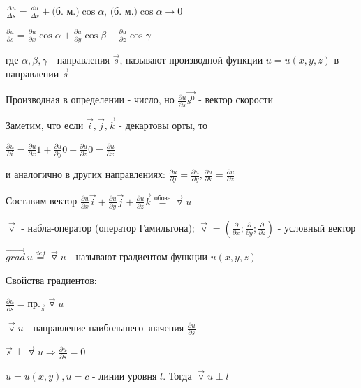 \documentclass[12pt]{article}
\begin{document}
    $\frac{\Delta u}{\Delta s} = \frac{du}{\Delta s} + \text{(б. м.)} \cos\alpha$, $\text{(б. м.)} \cos\alpha \rightarrow 0$

    \Def $\frac{\partial u}{\partial s} = \frac{\partial u}{\partial x} \cos\alpha + \frac{\partial u}{\partial y} \cos\beta + \frac{\partial u}{\partial z} \cos\gamma$

    где $\alpha, \beta, \gamma$ - направления $\overrightarrow{s}$, называют производной функции $u = u(x, y, z)$ в направлении $\overrightarrow{s}$

    \Nota Производная в определении - число, но $\frac{\partial u}{\partial s} \overrightarrow{s^0}$ - вектор скорости

    \Nota Заметим, что если $\overrightarrow{i}, \overrightarrow{j}, \overrightarrow{k}$ - декартовы орты, то

    $\frac{\partial u}{\partial i} = \frac{\partial u}{\partial x} 1 + \frac{\partial u}{\partial y} 0 + \frac{\partial u}{\partial z} 0 = \frac{\partial u}{\partial x}$

    и аналогично в других направлениях: $\frac{\partial u}{\partial j} = \frac{\partial u}{\partial y}, \frac{\partial u}{\partial k} = \frac{\partial u}{\partial z}$

    Составим вектор $\frac{\partial u}{\partial x} \overrightarrow{i} + \frac{\partial u}{\partial y} \overrightarrow{j} + \frac{\partial u}{\partial z} \overrightarrow{k} \stackrel{\text{обозн}}{=} \overrightarrow{\triangledown} u$

    $\overrightarrow{\triangledown}$ - набла-оператор (оператор Гамильтона); $\overrightarrow{\triangledown} = (\frac{\partial}{\partial x}; \frac{\partial}{\partial y}; \frac{\partial}{\partial z})$ - условный вектор

    \Def $\overrightarrow{grad} \ u \stackrel{def}{=} \overrightarrow{\triangledown} u$ - называют градиентом функции $u(x, y, z)$

    Свойства градиентов:

     $\frac{\partial u}{\partial s} = \text{пр.}_{\overrightarrow{s}} \overrightarrow{\triangledown} u$

     $\overrightarrow{\triangledown} u$ - направление наибольшего значения $\frac{\partial u}{\partial s}$

     $\overrightarrow{s} \perp \overrightarrow{\triangledown} u \Longrightarrow \frac{\partial u}{\partial s} = 0$

     $u = u(x, y), u = c$ - линии уровня $l$. Тогда $\overrightarrow{\triangledown} u \perp l$
\end{document}

